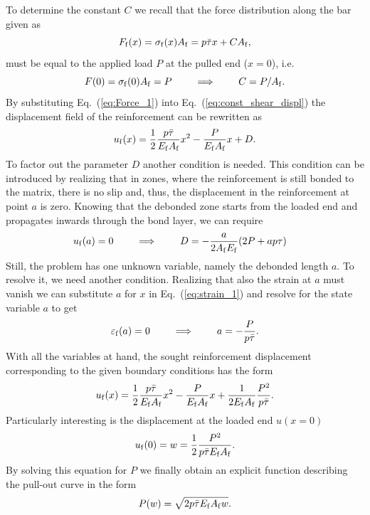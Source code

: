 \documentclass[main.tex]{subfiles}
\begin{document}
To determine the constant $C$ we recall that the force distribution  along the bar given as
\begin{equation} \label{eq:Force}
F_{\mathrm{f}}(x)  = \sigma_{\mathrm{f}} (x)  A_{\mathrm{f}} =  p \bar{\tau} x + C A_{\mathrm{f}},
\end{equation}  
must be equal to the applied load $P$ at the pulled end ($x=0$), i.e.
\begin{equation} \label{eq:Force_1}
F(0) = \sigma_{\mathrm{f}} (0)  A_{\mathrm{f}} = P \qquad  \implies \qquad   C = P/A_{\mathrm{f}}.
\end{equation}
By substituting  Eq.~(\ref{eq:Force_1}) into Eq.~(\ref{eq:const_shear_displ}) 
the displacement field of the reinforcement can be rewritten as
\begin{align} 
u_{\mathrm{f}}(x) = 
\frac{1}{2}
\frac{p \bar{\tau}}{E_{\mathrm{f}} A_{\mathrm{f}}} x^2 - \frac{P}{E_{\mathrm{f}} A_{\mathrm{f}}} x + D.
\label{eq:displacement_3}
\end{align}
To factor out the parameter $D$ another condition is needed. This condition can be introduced
by realizing that in zones, where the reinforcement is still bonded to the matrix, there is no slip and, thus, 
the displacement in the reinforcement at point $a$ is zero.  
Knowing that the debonded zone starts from the loaded end and propagates
inwards through the bond layer, we can require
\begin{align} 
u_{\mathrm{f}}(a) & = 0
  \qquad  \implies \qquad
D = - \frac{a}{2 A_\mathrm{f} E_\mathrm{f}} (2P + ap\tau)
\label{eq:displacement_4}
\end{align}
Still, the problem has one unknown variable, namely the debonded length $a$. To resolve it, we need another condition. Realizing that also the strain at $a$ must vanish we can substitute $a$ for $x$ in Eq.~(\ref{eq:strain_1}) and resolve for the state variable $a$ to get
\begin{align}
\varepsilon_{\mathrm{f}}(a) = 0  \qquad  \implies \qquad  a = -\frac{P}{p \bar{\tau}}  \label{eq:strain_4}.
\end{align}
With all the variables at hand, the sought reinforcement displacement corresponding to the given boundary conditions has the form
\begin{equation} \label{eq:displacement_5}
u_{\mathrm{f}}(x) = 
\frac{1}{2}
\frac{p \bar{\tau}}{E_{\mathrm{f}} A_{\mathrm{f}}} x^2 - \frac{P}{E_{\mathrm{f}} A_{\mathrm{f}}} x + 
\frac{1}{2 E_{\mathrm{f}} A_{\mathrm{f}}} \frac{P^2}{p \bar{\tau}}.
\end{equation} 
Particularly interesting is the  displacement at the loaded end $u(x=0)$
\begin{equation} \label{eq:displacement_6}
u_{\mathrm{f}}(0)= w = \frac{1}{2} \frac{P^2}{p \bar{\tau} E_{\mathrm{f}} A_{\mathrm{f}}} .
\end{equation}
By solving this equation for $P$ we finally obtain an explicit function describing the pull-out curve in the form
\begin{equation} \label{eq:pullout}
P(w)= \sqrt{2  p \bar{\tau} E_{\mathrm{f}} A_{\mathrm{f}} w }.
\end{equation}
\end{document}
